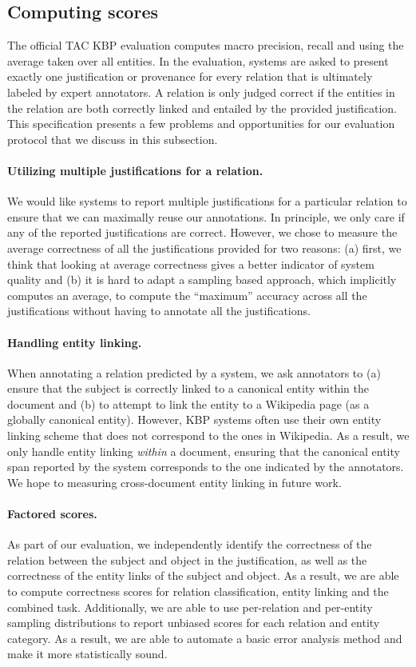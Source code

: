 \subsection{Computing scores}
The official TAC KBP evaluation computes macro precision, recall and \fone{} using the average taken over all entities.
In the evaluation, systems are asked to present exactly one justification or provenance for every relation that is ultimately labeled by expert annotators.  
A relation is only judged correct if the entities in the relation are both correctly linked and entailed by the provided justification.
This specification presents a few problems and opportunities for our evaluation protocol that we discuss in this subsection. 

\paragraph{Utilizing multiple justifications for a relation.}
We would like systems to report multiple justifications for a particular relation to ensure that we can maximally reuse our annotations.
In principle, we only care if any of the reported justifications are correct.
However, we chose to measure the average correctness of all the justifications provided for two reasons:
  (a) first, we think that looking at average correctness gives a better indicator of system quality and 
  (b) it is hard to adapt a sampling based approach, which implicitly computes an average, to compute the ``maximum'' accuracy across all the justifications without having to annotate all the justifications.

\paragraph{Handling entity linking.}
When annotating a relation predicted by a system, we ask annotators to (a) ensure that the subject is correctly linked to a canonical entity within the document and (b) to attempt to link the entity to a Wikipedia page (as a globally canonical entity).
However, KBP systems often use their own entity linking scheme that does not correspond to the ones in Wikipedia.
As a result, we only handle entity linking \textit{within} a document, ensuring that the canonical entity span reported by the system corresponds to the one indicated by the annotators.
We hope to measuring cross-document entity linking in future work.

\paragraph{Factored scores.}
As part of our evaluation, we independently identify the correctness of the relation between the subject and object in the justification, as well as the correctness of the entity links of the subject and object.
As a result, we are able to compute correctness scores for relation classification, entity linking and the combined task.
Additionally, we are able to use per-relation and per-entity sampling distributions to report unbiased scores for each relation and entity category.
As a result, we are able to automate a basic error analysis method and make it more statistically sound.

